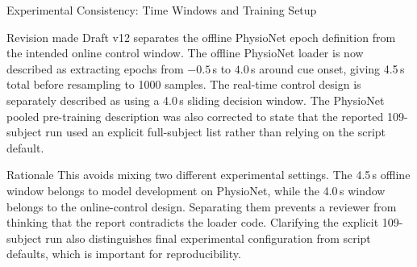 \documentclass[UTF8,aspectratio=169,11pt]{ctexbeamer}
\begin{document}
\begin{frame}[t]{Experimental Consistency: Time Windows and Training Setup}
\footnotesize

    \begin{block}{Revision made}
        Draft v12 separates the offline PhysioNet epoch definition from the intended online control window. The offline PhysioNet loader is now described as extracting epochs from $-0.5$\,s to $4.0$\,s around cue onset, giving 4.5\,s total before resampling to 1000 samples. The real-time control design is separately described as using a 4.0\,s sliding decision window. The PhysioNet pooled pre-training description was also corrected to state that the reported 109-subject run used an explicit full-subject list rather than relying on the script default.
    \end{block}

    \vfill

    \begin{alertblock}{Rationale}
        This avoids mixing two different experimental settings. The 4.5\,s offline window belongs to model development on PhysioNet, while the 4.0\,s window belongs to the online-control design. Separating them prevents a reviewer from thinking that the report contradicts the loader code. Clarifying the explicit 109-subject run also distinguishes final experimental configuration from script defaults, which is important for reproducibility.
    \end{alertblock}

\end{frame}
\end{document}
